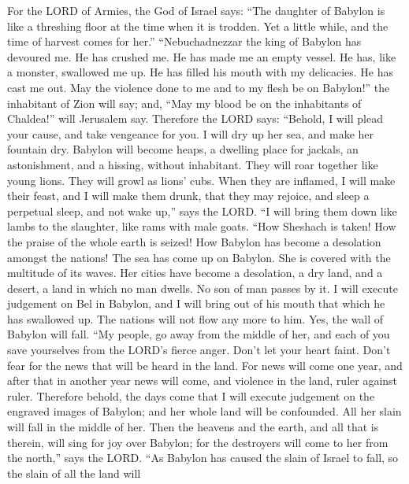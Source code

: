  For the LORD of Armies, the God of Israel says: ``The
daughter of Babylon is like a threshing floor at the time when it is
trodden. Yet a little while, and the time of harvest comes for her.''
 ``Nebuchadnezzar the king of Babylon has devoured me. He
has crushed me. He has made me an empty vessel. He has, like a monster,
swallowed me up. He has filled his mouth with my delicacies. He has cast
me out.  May the violence done to me and to my flesh be
on Babylon!'' the inhabitant of Zion will say; and, ``May my blood be on
the inhabitants of Chaldea!'' will Jerusalem say. 
Therefore the LORD says: ``Behold, I will plead your cause, and take
vengeance for you. I will dry up her sea, and make her fountain dry.
 Babylon will become heaps, a dwelling place for jackals,
an astonishment, and a hissing, without inhabitant.  They
will roar together like young lions. They will growl as lions' cubs.
 When they are inflamed, I will make their feast, and I
will make them drunk, that they may rejoice, and sleep a perpetual
sleep, and not wake up,'' says the LORD.  ``I will bring
them down like lambs to the slaughter, like rams with male goats.
 ``How Sheshach is taken! How the praise of the whole
earth is seized! How Babylon has become a desolation amongst the
nations!  The sea has come up on Babylon. She is covered
with the multitude of its waves.  Her cities have become
a desolation, a dry land, and a desert, a land in which no man dwells.
No son of man passes by it.  I will execute judgement on
Bel in Babylon, and I will bring out of his mouth that which he has
swallowed up. The nations will not flow any more to him. Yes, the wall
of Babylon will fall.  ``My people, go away from the
middle of her, and each of you save yourselves from the LORD's fierce
anger.  Don't let your heart faint. Don't fear for the
news that will be heard in the land. For news will come one year, and
after that in another year news will come, and violence in the land,
ruler against ruler.  Therefore behold, the days come
that I will execute judgement on the engraved images of Babylon; and her
whole land will be confounded. All her slain will fall in the middle of
her.  Then the heavens and the earth, and all that is
therein, will sing for joy over Babylon; for the destroyers will come to
her from the north,'' says the LORD.  ``As Babylon has
caused the slain of Israel to fall, so the slain of all the land will
